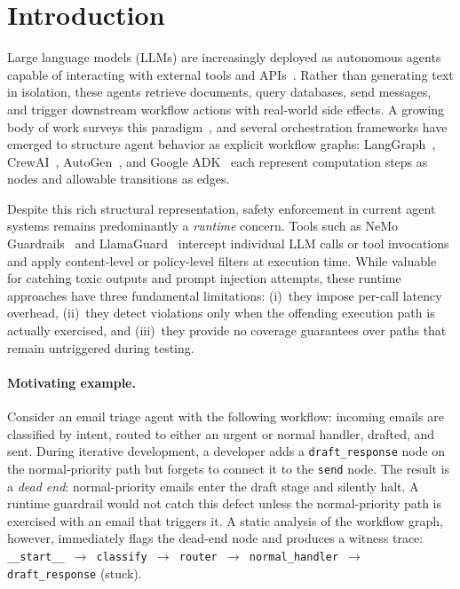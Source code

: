 \section{Introduction}
\label{sec:introduction}

Large language models (LLMs) are increasingly deployed as autonomous
agents capable of interacting with external tools and
APIs~\citep{schick2024toolformer, yao2023react}. Rather than generating
text in isolation, these agents retrieve documents, query databases,
send messages, and trigger downstream workflow actions with
real-world side effects. A growing body of work surveys this
paradigm~\citep{wang2024agent_survey}, and several orchestration
frameworks have emerged to structure agent behavior as explicit workflow
graphs: LangGraph~\citep{langgraph_docs},
CrewAI~\citep{crewai_docs}, AutoGen~\citep{wu2023autogen}, and Google
ADK~\citep{google_adk_docs} each represent computation steps as nodes
and allowable transitions as edges.

Despite this rich structural representation, safety enforcement in
current agent systems remains predominantly a \emph{runtime} concern.
Tools such as NeMo Guardrails~\citep{nemo_guardrails} and
LlamaGuard~\citep{llamaguard} intercept individual LLM calls or tool
invocations and apply content-level or policy-level filters at execution
time. While valuable for catching toxic outputs and prompt injection
attempts, these runtime approaches have three fundamental limitations:
(i)~they impose per-call latency overhead, (ii)~they detect violations
only when the offending execution path is actually exercised, and
(iii)~they provide no coverage guarantees over paths that remain
untriggered during testing.

\paragraph{Motivating example.}
Consider an email triage agent with the following workflow: incoming
emails are classified by intent, routed to either an urgent or normal
handler, drafted, and sent. During iterative development, a developer
adds a \texttt{draft\_response} node on the normal-priority path but
forgets to connect it to the \texttt{send} node. The result is a
\emph{dead end}: normal-priority emails enter the draft stage and
silently halt. A runtime guardrail would not catch this defect unless
the normal-priority path is exercised with an email that triggers it.
A static analysis of the workflow graph, however, immediately flags the
dead-end node and produces a witness trace:
\texttt{\_\_start\_\_ $\to$ classify $\to$ router $\to$
normal\_handler $\to$ draft\_response} (stuck).

